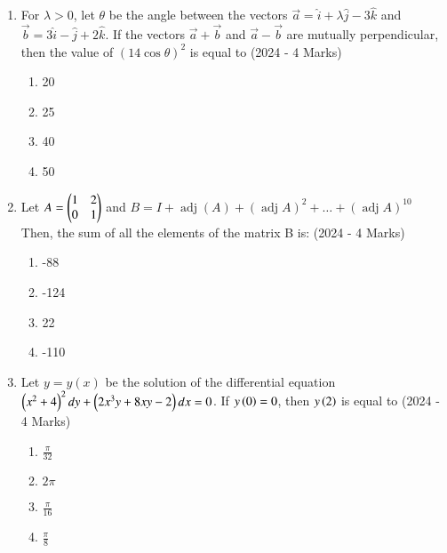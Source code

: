 \documentclass[journal]{IEEEtran}
\begin{document}
    \begin{enumerate}
   	\item{
    		
    		For $\lambda>0$, let $\theta$ be the angle between the vectors $\vec{a}=\hat{i}+\lambda \hat{j}-3 \hat{k}$ and $\vec{b}=3 \hat{i}-\hat{j}+2 \hat{k}$. If the vectors $\vec{a}+\vec{b}$ and $\vec{a}-\vec{b}$ are mutually perpendicular, then the value of $(14 \cos\theta)^{2}$ is equal to\text{ }
    		\hfill
    		{(2024 - 4 Marks)}
    		\begin{multicols}{4}
    			\begin{enumerate}
    				\item 20
    				\item 25
    				\item 40
    				\item 50
    			\end{enumerate}
    		\end{multicols}
    	}
    \item{
          	Let $A=\begin{pmatrix}1 & 2 \\ 0 & 1\end{pmatrix}$ and $B=I+\operatorname{adj}(A)+(\operatorname{adj} A)^{2}+\ldots+(\operatorname{adj} A)^{10}$
          	Then, the sum of all the elements of the matrix B is: \text{  } \hfill
                {(2024 - 4 Marks)}
                \begin{multicols}{4}
					\begin{enumerate}
						\item -88
						\item -124
						\item 22
						\item -110
					\end{enumerate}
				\end{multicols}
            }

\item{
        	
        	
        	Let $y=y(x)$ be the solution of the differential equation 
        	$\left(x^{2}+4\right)^{2} d y+\left(2 x^{3} y+8 x y-2\right) d x=0$. If $y\left(0\right)=0$, then $y\left(2\right)$ is equal to
        	\hfill
        	{(2024 - 4 Marks)}
        	\begin{multicols}{4}
        		\begin{enumerate}
        			\item  $\frac{\pi}{32}$
        			\item  $2\pi$
        			\item  $\frac{\pi}{16}$
        			\item  $\frac{\pi}{8}$
        		\end{enumerate}
        	\end{multicols}
        	
}
\end{enumerate}
\end{document}

